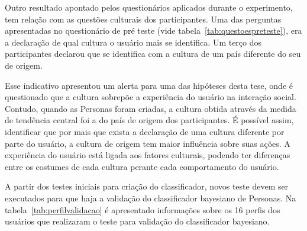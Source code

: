 Outro resultado apontado pelos questionários aplicados durante o experimento, tem relação com as questões culturais dos participantes. Uma das perguntas apresentadas no questionário de pré teste (vide tabela~\ref{tab:questoespreteste}), era a declaração de qual cultura o usuário mais se identifica. Um terço dos participantes declarou que se identifica com a cultura de um país diferente do seu de origem.

Esse indicativo apresentou um alerta para uma das hipóteses desta tese, onde é questionado que a cultura sobrepõe a experiência do usuário na interação social. Contudo, quando as Personas foram criadas, a cultura obtida através da medida de tendência central foi a do país de origem dos participantes. É possível assim, identificar que por mais que exista a declaração de uma cultura diferente por parte do usuário, a cultura de origem tem maior influência sobre suas ações. A experiência do usuário está ligada aos fatores culturais, podendo ter diferenças entre os costumes de cada cultura perante cada comportamento do usuário.

A partir dos testes iniciais para criação do classificador, novos teste devem ser executados para que haja a validação do classificador bayesiano de Personas. Na tabela~\ref{tab:perfilvalidacao} é apresentado informações sobre os 16 perfis dos usuários que realizaram o teste para validação do classificador bayesiano.

